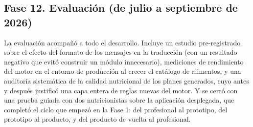 \subsection*{Fase 12. Evaluación (de julio a septiembre de 2026)}

La evaluación acompañó a todo el desarrollo. Incluye un estudio pre-registrado sobre el efecto del formato de los mensajes en la traducción (con un resultado negativo que evitó construir un módulo innecesario), mediciones de rendimiento del motor en el entorno de producción al crecer el catálogo de alimentos, y una auditoría sistemática de la calidad nutricional de los planes generados, cuyo antes y después justificó una capa entera de reglas nuevas del motor. Y se cerró con una prueba guiada con dos nutricionistas sobre la aplicación desplegada, que completó el ciclo que empezó en la Fase 1: del profesional al prototipo, del prototipo al producto, y del producto de vuelta al profesional.